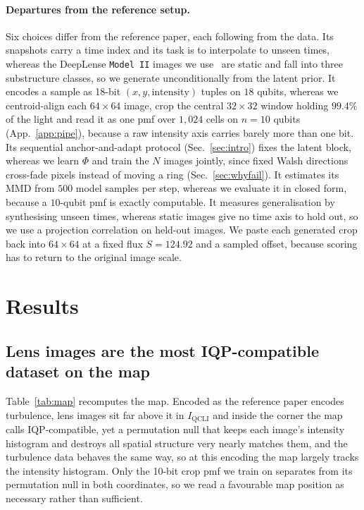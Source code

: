 \documentclass{article}
\newcommand{\qcli}{I_{\mathrm{QCLI}}}
\begin{document}
\paragraph{Departures from the reference setup.}
Six choices differ from the reference paper, each following from the data. Its snapshots carry a time
index and its task is to interpolate to unseen times, whereas the DeepLense \texttt{Model~II} images
we use~\cite{alexander_2020_deep,alexander_2023_domain,ml4sci_deeplense} are static and fall into
three substructure classes, so we generate unconditionally from the latent prior. It encodes a sample as 18-bit
$(x,y,\mathrm{intensity})$ tuples on $18$ qubits, whereas we centroid-align each $64\times64$ image,
crop the central $32\times32$ window holding $99.4\%$ of the light and read it as one pmf over
$1{,}024$ cells on $n=10$ qubits (App.~\ref{app:pipe}), because a raw intensity axis carries barely
more than one bit. Its sequential anchor-and-adapt protocol (Sec.~\ref{sec:intro}) fixes the
latent block, whereas we learn $\Phi$ and train the $N$ images jointly, since fixed Walsh directions
cross-fade pixels instead of moving a ring (Sec.~\ref{sec:whyfail}). It estimates its MMD from $500$
model samples per step, whereas we evaluate it in closed form, because a $10$-qubit pmf is exactly
computable. It measures generalisation by synthesising unseen times, whereas static images give
no time axis to hold out, so we use a projection correlation on held-out images. We paste each generated crop back into $64\times64$ at a fixed flux
$S = 124.92$ and a sampled offset, because scoring has to return to the original image scale.

\section{Results}
\label{sec:results}

\subsection{Lens images are the most IQP-compatible dataset on the map}
\label{sec:map}

Table~\ref{tab:map} recomputes the map. Encoded as the reference paper encodes turbulence, lens
images sit far above it in $\qcli$ and inside the corner the map calls
IQP-compatible, yet a permutation null that keeps each image's intensity histogram and destroys all
spatial structure very nearly matches them, and the turbulence data behaves the same way, so at this
encoding the map largely tracks the intensity histogram. Only the 10-bit crop pmf we train on
separates from its permutation null in both coordinates, so we read a favourable map position as
necessary rather than sufficient.
\end{document}
